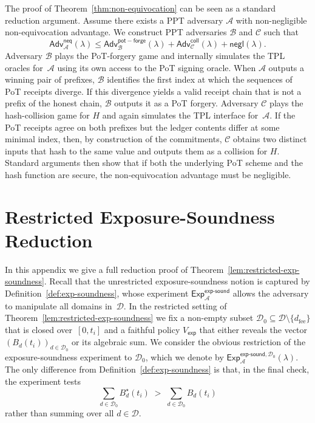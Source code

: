 \documentclass[11pt]{article}
\begin{document}
The proof of Theorem~\ref{thm:non-equivocation} can be seen as a standard reduction argument.
Assume there exists a PPT adversary $\mathcal{A}$ with non-negligible non-equivocation advantage.
We construct PPT adversaries $\mathcal{B}$ and $\mathcal{C}$ such that
\[
  \mathsf{Adv}^{\mathsf{neq}}_{\mathcal{A}}(\lambda)
  \leq
  \mathsf{Adv}^{\mathsf{pot-forge}}_{\mathcal{B}}(\lambda)
  +
  \mathsf{Adv}^{\mathsf{coll}}_{\mathcal{C}}(\lambda)
  + \mathsf{negl}(\lambda).
\]
Adversary $\mathcal{B}$ plays the PoT-forgery game and internally simulates the TPL oracles for~$\mathcal{A}$ using its own access to the PoT signing oracle.
When $\mathcal{A}$ outputs a winning pair of prefixes, $\mathcal{B}$ identifies the first index at which the sequences of PoT receipts diverge.
If this divergence yields a valid receipt chain that is not a prefix of the honest chain, $\mathcal{B}$ outputs it as a PoT forgery.
Adversary $\mathcal{C}$ plays the hash-collision game for $H$ and again simulates the TPL interface for~$\mathcal{A}$.
If the PoT receipts agree on both prefixes but the ledger contents differ at some minimal index, then, by construction of the commitments, $\mathcal{C}$ obtains two distinct inputs that hash to the same value and outputs them as a collision for $H$.
Standard arguments then show that if both the underlying PoT scheme and the hash function are secure, the non-equivocation advantage must be negligible.

\section{Restricted Exposure-Soundness Reduction}
\label{app:exp-soundness-reduction}

In this appendix we give a full reduction proof of Theorem~\ref{lem:restricted-exp-soundness}.
Recall that the unrestricted exposure-soundness notion is captured by
Definition~\ref{def:exp-soundness}, whose experiment
$\mathsf{Exp}^{\mathsf{exp\mbox{-}sound}}_{\mathcal{A}}$ allows the adversary to manipulate
all domains in~$\mathcal{D}$.
In the restricted setting of Theorem~\ref{lem:restricted-exp-soundness} we fix a non-empty
subset $\mathcal{D}_0 \subseteq \mathcal{D}\setminus\{d_{\mathrm{fee}}\}$ that is closed over~$[0,t_i]$
and a faithful policy $V_{\mathsf{exp}}$ that either reveals the vector
$(B_d(t_i))_{d\in\mathcal{D}_0}$ or its algebraic sum.
We consider the obvious restriction of the exposure-soundness experiment to $\mathcal{D}_0$,
which we denote by $\mathsf{Exp}^{\mathsf{exp\mbox{-}sound},\mathcal{D}_0}_{\mathcal{A}}(\lambda)$.
The only difference from Definition~\ref{def:exp-soundness} is that, in the final check, the
experiment tests
\[
  \sum_{d\in\mathcal{D}_0} B_d^\star(t_i) \;>\;
  \sum_{d\in\mathcal{D}_0} B_d(t_i)
\]
rather than summing over all $d\in\mathcal{D}$.
\end{document}
